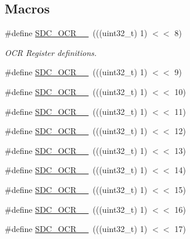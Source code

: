 \subsection*{Macros}
\begin{DoxyCompactItemize}
\item 
\#define \hyperlink{group___c_h_i_p___s_d_m_m_c___definitions_ga22f9a95fb2cb0b0442a8e15e85c02309}{S\+D\+C\+\_\+\+O\+C\+R\+\_\+\_}~(((uint32\+\_\+t) 1) $<$$<$ 8)
\begin{DoxyCompactList}\small\item\em O\+CR Register definitions. \end{DoxyCompactList}\item 
\#define \hyperlink{group___c_h_i_p___s_d_m_m_c___definitions_ga4859335686cfb475044c3f295e22ad41}{S\+D\+C\+\_\+\+O\+C\+R\+\_\+\_}~(((uint32\+\_\+t) 1) $<$$<$ 9)
\item 
\#define \hyperlink{group___c_h_i_p___s_d_m_m_c___definitions_ga89420303e5206b28f7f7fe9d712682dc}{S\+D\+C\+\_\+\+O\+C\+R\+\_\+\_}~(((uint32\+\_\+t) 1) $<$$<$ 10)
\item 
\#define \hyperlink{group___c_h_i_p___s_d_m_m_c___definitions_gad6d151374e65c4ec33ae2cd44e2da6bc}{S\+D\+C\+\_\+\+O\+C\+R\+\_\+\_}~(((uint32\+\_\+t) 1) $<$$<$ 11)
\item 
\#define \hyperlink{group___c_h_i_p___s_d_m_m_c___definitions_gaa3d37d5080f2b5ac3a627a684fae00ad}{S\+D\+C\+\_\+\+O\+C\+R\+\_\+\_}~(((uint32\+\_\+t) 1) $<$$<$ 12)
\item 
\#define \hyperlink{group___c_h_i_p___s_d_m_m_c___definitions_ga6cac4e4e0b70df4e109de1dca8af1726}{S\+D\+C\+\_\+\+O\+C\+R\+\_\+\_}~(((uint32\+\_\+t) 1) $<$$<$ 13)
\item 
\#define \hyperlink{group___c_h_i_p___s_d_m_m_c___definitions_ga1c71bab9362e057b2b3bb0bd515c0932}{S\+D\+C\+\_\+\+O\+C\+R\+\_\+\_}~(((uint32\+\_\+t) 1) $<$$<$ 14)
\item 
\#define \hyperlink{group___c_h_i_p___s_d_m_m_c___definitions_ga3b86b17c962cfd53a506a5cdf66d6d80}{S\+D\+C\+\_\+\+O\+C\+R\+\_\+\_}~(((uint32\+\_\+t) 1) $<$$<$ 15)
\item 
\#define \hyperlink{group___c_h_i_p___s_d_m_m_c___definitions_ga2216100efbb6771651505ef3e52cd8de}{S\+D\+C\+\_\+\+O\+C\+R\+\_\+\_}~(((uint32\+\_\+t) 1) $<$$<$ 16)
\item 
\#define \hyperlink{group___c_h_i_p___s_d_m_m_c___definitions_gaca5e2d08e3ca92f47754e682ca33b3fa}{S\+D\+C\+\_\+\+O\+C\+R\+\_\+\_}~(((uint32\+\_\+t) 1) $<$$<$ 17)

\end{DoxyCompactItemize}
